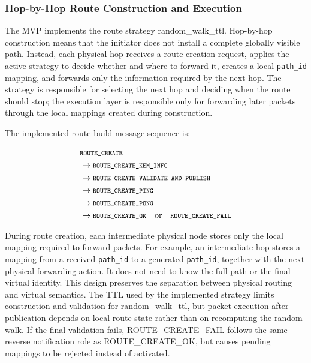 \documentclass[12pt]{article}
\newcommand{\codebreak}[1]{{\footnotesize\ttfamily #1}}
\newcommand{\codemath}[1]{\mbox{\footnotesize\ttfamily #1}}
\begin{document}
\subsubsection{Hop-by-Hop Route Construction and Execution}
\label{subsec:hop-by-hop-route-construction-execution}

The MVP implements the route strategy \codebreak{random\_\allowbreak{}walk\_\allowbreak{}ttl}. Hop-by-hop construction means that the initiator does not install a complete globally visible path. Instead, each physical hop receives a route creation request, applies the active strategy to decide whether and where to forward it, creates a local \texttt{path\_id} mapping, and forwards only the information required by the next hop. The strategy is responsible for selecting the next hop and deciding when the route should stop; the execution layer is responsible only for forwarding later packets through the local mappings created during construction.

The implemented route build message sequence is:

\begin{equation}
\begin{aligned}
&\codemath{ROUTE\_\allowbreak{}CREATE} \\
&\rightarrow \codemath{ROUTE\_\allowbreak{}CREATE\_\allowbreak{}KEM\_\allowbreak{}INFO} \\
&\rightarrow \codemath{ROUTE\_\allowbreak{}CREATE\_\allowbreak{}VALIDATE\_\allowbreak{}AND\_\allowbreak{}PUBLISH} \\
&\rightarrow \codemath{ROUTE\_\allowbreak{}CREATE\_\allowbreak{}PING} \\
&\rightarrow \codemath{ROUTE\_\allowbreak{}CREATE\_\allowbreak{}PONG} \\
&\rightarrow \codemath{ROUTE\_\allowbreak{}CREATE\_\allowbreak{}OK}
\quad \text{or} \quad
\codemath{ROUTE\_\allowbreak{}CREATE\_\allowbreak{}FAIL}
\end{aligned}
\end{equation}

During route creation, each intermediate physical node stores only the local mapping required to forward packets. For example, an intermediate hop stores a mapping from a received \texttt{path\_id} to a generated \texttt{path\_id}, together with the next physical forwarding action. It does not need to know the full path or the final virtual identity. This design preserves the separation between physical routing and virtual semantics. The TTL used by the implemented strategy limits construction and validation for \codebreak{random\_\allowbreak{}walk\_\allowbreak{}ttl}, but packet execution after publication depends on local route state rather than on recomputing the random walk. If the final validation fails, \codebreak{ROUTE\_\allowbreak{}CREATE\_\allowbreak{}FAIL} follows the same reverse notification role as \codebreak{ROUTE\_\allowbreak{}CREATE\_\allowbreak{}OK}, but causes pending mappings to be rejected instead of activated.
\end{document}
